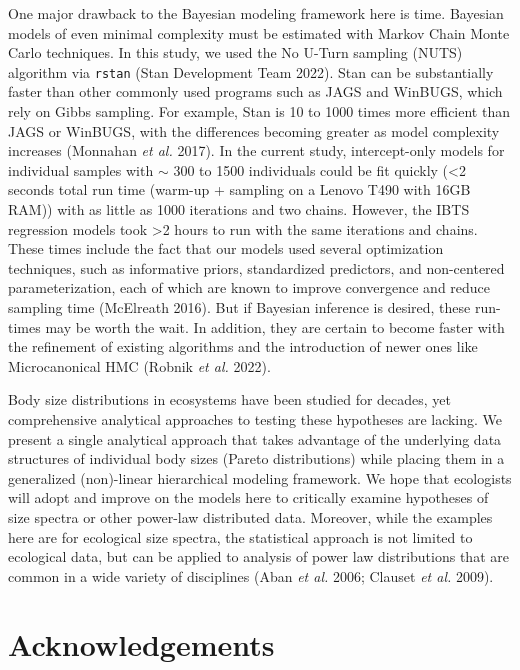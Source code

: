 \documentclass[
  12pt,
]{article}
\begin{document}
One major drawback to the Bayesian modeling framework here is time.
Bayesian models of even minimal complexity must be estimated with Markov
Chain Monte Carlo techniques. In this study, we used the No U-Turn
sampling (NUTS) algorithm via \texttt{rstan} (Stan Development Team
2022). Stan can be substantially faster than other commonly used
programs such as JAGS and WinBUGS, which rely on Gibbs sampling. For
example, Stan is 10 to 1000 times more efficient than JAGS or WinBUGS,
with the differences becoming greater as model complexity increases
(Monnahan \emph{et al.} 2017). In the current study, intercept-only
models for individual samples with \(\sim\) 300 to 1500 individuals
could be fit quickly (\textless2 seconds total run time (warm-up +
sampling on a Lenovo T490 with 16GB RAM)) with as little as 1000
iterations and two chains. However, the IBTS regression models took
\textgreater2 hours to run with the same iterations and chains. These
times include the fact that our models used several optimization
techniques, such as informative priors, standardized predictors, and
non-centered parameterization, each of which are known to improve
convergence and reduce sampling time (McElreath 2016). But if Bayesian
inference is desired, these run-times may be worth the wait. In
addition, they are certain to become faster with the refinement of
existing algorithms and the introduction of newer ones like
Microcanonical HMC (Robnik \emph{et al.} 2022).

Body size distributions in ecosystems have been studied for decades, yet
comprehensive analytical approaches to testing these hypotheses are
lacking. We present a single analytical approach that takes advantage of
the underlying data structures of individual body sizes (Pareto
distributions) while placing them in a generalized (non)-linear
hierarchical modeling framework. We hope that ecologists will adopt and
improve on the models here to critically examine hypotheses of size
spectra or other power-law distributed data. Moreover, while the
examples here are for ecological size spectra, the statistical approach
is not limited to ecological data, but can be applied to analysis of
power law distributions that are common in a wide variety of disciplines
(Aban \emph{et al.} 2006; Clauset \emph{et al.} 2009).

\hypertarget{acknowledgements}{%
\section{Acknowledgements}\label{acknowledgements}}
\end{document}
